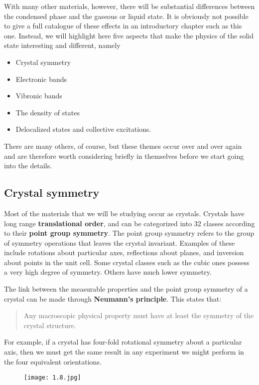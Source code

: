 \documentclass[12pt]{book}
\begin{document}
With many other materials, however, there will be substantial differences between the condensed phase and the gaseous or liquid state. It is obviously not possible to give a full catalogue of these effects in an introductory chapter such as this one. Instead, we will highlight here five aspects that make the physics of the solid state interesting and different, namely
\begin{itemize}
  \item Crystal symmetry
  \item Electronic bands
  \item Vibronic bands
  \item The density of states
  \item Delocalized states and collective excitations.
\end{itemize}
There are many others, of course, but these themes occur over and over again and are therefore worth considering briefly in themselves before we start going into the details.

\subsection{Crystal symmetry}

Most of the materials that we will be studying occur as crystals. Crystals have long range \textbf{translational order}, and can be categorized into 32 classes according to their \textbf{point group symmetry}. The point group symmetry refers to the group of symmetry operations that leaves the crystal invariant. Examples of these include rotations about particular axes, reflections about planes, and inversion about points in the unit cell. Some crystal classes such as the cubic ones possess a very high degree of symmetry. Others have much lower symmetry.

The link between the measurable properties and the point group symmetry of a crystal can be made through \textbf{Neumann's principle}. This states that:
\begin{quote}
  Any macroscopic physical property must have at least the symmetry of the crystal structure.
\end{quote}
For example, if a crystal has four-fold rotational symmetry about a particular axis, then we must get the same result in any experiment we might perform in the four equivalent orientations.
\begin{figure}[htbp]
  \texttt{[image: 1.8.jpg]}\\
  \label{fig:1.8}
\end{figure}
\end{document}
